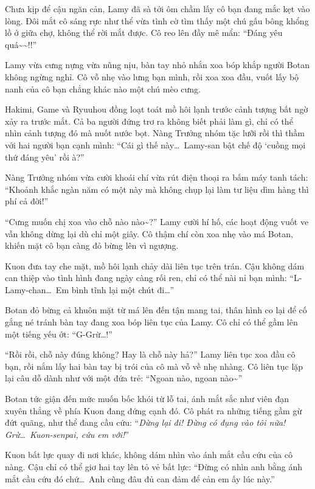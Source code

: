 \documentclass[../main.tex]{subfiles}
\begin{document}
Chưa kịp để cậu ngăn cản, Lamy đã sà tới ôm chầm lấy cô bạn đang mắc kẹt vào lòng. Đôi mắt cô sáng rực như thể vừa tình cờ tìm thấy một chú gấu bông khổng lồ ở giữa chợ, không thể rời mắt được. Cô reo lên đầy mê mẩn: ``Đáng yêu quá\~{}\~{}!!''


Lamy vừa cưng nựng vừa nũng nịu, bàn tay nhỏ nhắn xoa bóp khắp người Botan không ngừng nghỉ. Cô vỗ nhẹ vào lưng bạn mình, rồi xoa xoa đầu, vuốt lấy bộ nanh của cô bạn chẳng khác nào một chú mèo cưng.

Hakimi, Game và Ryuuhou đồng loạt toát mồ hôi lạnh trước cảnh tượng bất ngờ xảy ra trước mắt. Cả ba người đứng trơ ra không biết phải làm gì, chỉ có thể nhìn cảnh tượng đó mà nuốt nước bọt. Nàng Trưởng nhóm tặc lưỡi rồi thì thầm với hai người bạn cạnh mình: ``Cái gì thế này\dots\ Lamy-san bật chế độ `cuồng mọi thứ đáng yêu' rồi à?''

Nàng Trưởng nhóm vừa cười khoái chí vừa rút điện thoại ra bấm máy tanh tách: ``Khoảnh khắc ngàn năm có một này mà không chụp lại làm tư liệu dìm hàng thì phí cả đời!''

``Cưng muốn chị xoa vào chỗ nào nào\~{}?'' Lamy cười hí hố, các hoạt động vuốt ve vẫn không dừng lại dù chỉ một giây. Cô thậm chí còn xoa nhẹ vào má Botan, khiến mặt cô bạn càng đỏ bừng lên vì ngượng.

Kuon đưa tay che mặt, mồ hôi lạnh chảy dài liên tục trên trán. Cậu không dám can thiệp vào tình hình đang ngày càng rối ren, chỉ có thể nài nỉ bạn mình: ``L-Lamy-chan\dots\ Em bình tĩnh lại một chút đi\dots''

Botan đỏ bừng cả khuôn mặt từ má lên đến tận mang tai, thân hình co lại để cố gắng né tránh bàn tay đang xoa bóp liên tục của Lamy. Cô chỉ có thể gầm lên một tiếng yếu ớt: ``G-Grừ\dots!''

``Rồi rồi, chỗ này đúng không? Hay là chỗ này hả?'' Lamy liên tục xoa đầu cô bạn, rồi nắm lấy hai bàn tay bị trói của cô mà vỗ về nhẹ nhàng. Cô liên tục lặp lại câu dỗ dành như với một đứa trẻ: ``Ngoan nào, ngoan nào\~{}''

Botan tức giận đến mức muốn bốc khói từ lỗ tai, ánh mắt sắc như viên đạn xuyên thẳng về phía Kuon đang đứng cạnh đó. Cô phát ra những tiếng gầm gừ đứt quãng, như thể đang cầu cứu: ``\textit{Dừng lại đi! Đừng có đụng vào tôi nữa! Grừ\dots\ Kuon-senpai, cứu em với!}''

Kuon bất lực quay đi nơi khác, không dám nhìn vào ánh mắt cầu cứu của cô nàng. Cậu chỉ có thể giơ hai tay lên tỏ vẻ bất lực: ``Đừng có nhìn anh bằng ánh mắt cầu cứu đó chứ\dots\ Anh cũng đâu đủ can đảm để cản em ấy lúc này.''
\end{document}
